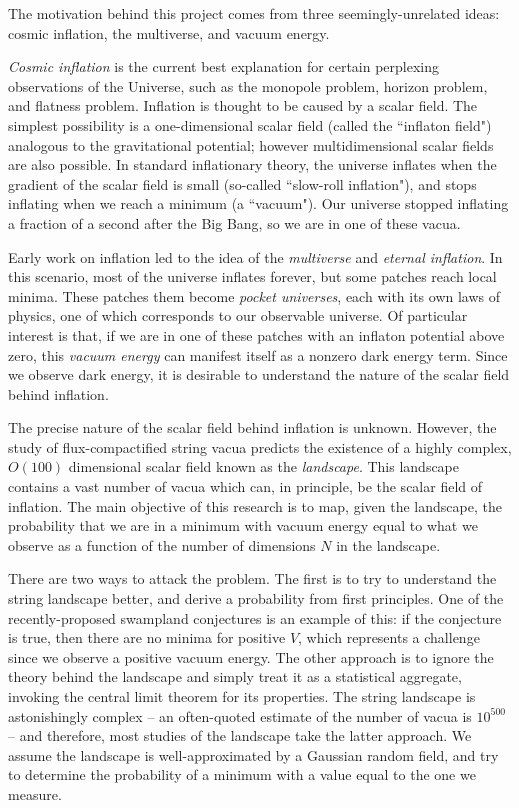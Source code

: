 \documentclass[12pt]{article}
\begin{document}

The motivation behind this project comes from three seemingly-unrelated ideas: cosmic inflation, the multiverse, and vacuum energy. 

\emph{Cosmic inflation} is the current best explanation for certain perplexing observations of the Universe, such as the monopole problem, horizon problem, and flatness problem.\cite{Ryden} Inflation is thought to be caused by a scalar field. The simplest possibility is a one-dimensional scalar field (called the ``inflaton field") analogous to the gravitational potential; however multidimensional scalar fields are also possible. In standard inflationary theory, the universe inflates when the gradient of the scalar field is small (so-called ``slow-roll inflation"), and stops inflating when we reach a minimum (a ``vacuum").\cite{Baumann} Our universe stopped inflating a fraction of a second after the Big Bang, so we are in one of these vacua.

Early work on inflation led to the idea of the \emph{multiverse} and \emph{eternal inflation}.\cite{Guth2001} In this scenario, most of the universe inflates forever, but some patches reach local minima. These patches them become \emph{pocket universes}, each with its own laws of physics, one of which corresponds to our observable universe. Of particular interest is that, if we are in one of these patches with an inflaton potential above zero, this \emph{vacuum energy} can manifest itself as a nonzero dark energy term. Since we observe dark energy, it is desirable to understand the nature of the scalar field behind inflation.

The precise nature of the scalar field behind inflation is unknown. However, the study of flux-compactified string vacua predicts the existence of a highly complex, $O(100)$ dimensional scalar field known as the \emph{landscape}.\cite{Bousso2000} This landscape contains a vast number of vacua which can, in principle, be the scalar field of inflation. The main objective of this research is to map, given the landscape, the probability that we are in a minimum with vacuum energy equal to what we observe as a function of the number of dimensions $N$ in the landscape. 

There are two ways to attack the problem. The first is to try to understand the string landscape better, and derive a probability from first principles. One of the recently-proposed swampland conjectures is an example of this:\cite{Agrawal2018} if the conjecture is true, then there are no minima for positive $V$, which represents a challenge since we observe a positive vacuum energy. The other approach is to ignore the theory behind the landscape and simply treat it as a statistical aggregate, invoking the central limit theorem for its properties. The string landscape is astonishingly complex -- an often-quoted estimate of the number of vacua is $10^{500}$\cite{Douglas} -- and therefore, most studies of the landscape take the latter approach.\cite{GRF1, GRF2, GRF3} We assume the landscape is well-approximated by a Gaussian random field, and try to determine the probability of a minimum with a value equal to the one we measure.
\end{document}
